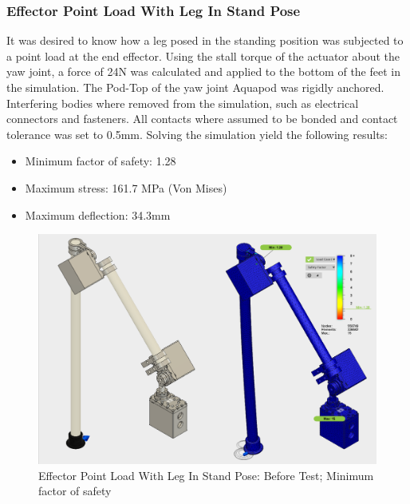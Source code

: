 \subsubsection{Effector Point Load With Leg In Stand Pose }
It was desired to know how a leg posed in the standing position was subjected to a point load at the end effector. Using the stall torque of the actuator about the yaw joint, a force of 24N was calculated and applied to the bottom of the feet in the simulation. The Pod-Top of the yaw joint Aquapod was rigidly anchored. 
Interfering bodies where removed from the simulation, such as electrical connectors and fasteners. All contacts where assumed to be bonded and contact tolerance was set to 0.5mm.
Solving the simulation yield the following results:
 \begin{itemize}
     \item Minimum factor of safety: 1.28
     \item Maximum stress: 161.7 MPa (Von Mises)
     \item Maximum deflection: 34.3mm
 \end{itemize}




\begin{figure}[h]
\centering
\includegraphics[width=1.0\columnwidth]{./img/aquaShoko-v3dot3-FEA-WithBearing-1.png}
\caption{Effector Point Load With Leg In Stand Pose: Before Test; Minimum factor of safety }
\label{fig:test two pressure check}
\end{figure}

